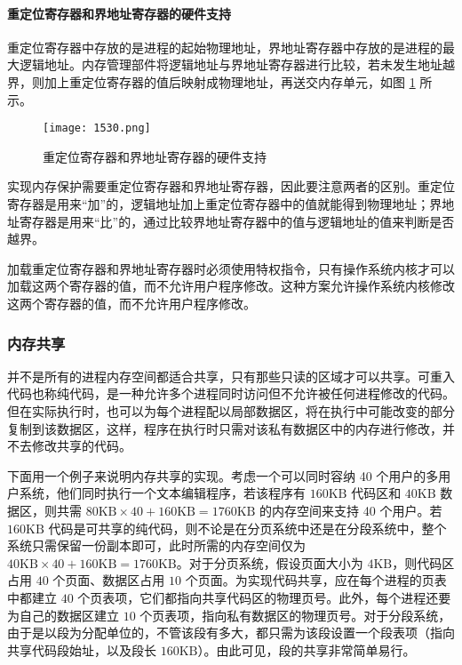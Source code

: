 \documentclass{ctexbook}
\begin{document}
	\paragraph{重定位寄存器和界地址寄存器的硬件支持}
	
	重定位寄存器中存放的是进程的起始物理地址，界地址寄存器中存放的是进程的最大逻辑地址。内存管理部件将逻辑地址与界地址寄存器进行比较，若未发生地址越界，则加上重定位寄存器的值后映射成物理地址，再送交内存单元，如图 \ref{fig:hardware_support} 所示。
	
	\begin{figure}[h]
		\centering
		\texttt{[image: 1530.png]}
		\caption{重定位寄存器和界地址寄存器的硬件支持}
		\label{fig:hardware_support}
	\end{figure}
	
	实现内存保护需要重定位寄存器和界地址寄存器，因此要注意两者的区别。重定位寄存器是用来“加”的，逻辑地址加上重定位寄存器中的值就能得到物理地址；界地址寄存器是用来“比”的，通过比较界地址寄存器中的值与逻辑地址的值来判断是否越界。
	
	加载重定位寄存器和界地址寄存器时必须使用特权指令，只有操作系统内核才可以加载这两个寄存器的值，而不允许用户程序修改。这种方案允许操作系统内核修改这两个寄存器的值，而不允许用户程序修改。
	
	
	\subsubsection{内存共享}
	
	并不是所有的进程内存空间都适合共享，只有那些只读的区域才可以共享。可重入代码也称纯代码，是一种允许多个进程同时访问但不允许被任何进程修改的代码。但在实际执行时，也可以为每个进程配以局部数据区，将在执行中可能改变的部分复制到该数据区，这样，程序在执行时只需对该私有数据区中的内存进行修改，并不去修改共享的代码。
	
	下面用一个例子来说明内存共享的实现。考虑一个可以同时容纳 40 个用户的多用户系统，他们同时执行一个文本编辑程序，若该程序有 $160\text{KB}$ 代码区和 $40\text{KB}$ 数据区，则共需 $80\text{KB} \times 40 + 160\text{KB} = 1760\text{KB}$ 的内存空间来支持 40 个用户。若 $160\text{KB}$ 代码是可共享的纯代码，则不论是在分页系统中还是在分段系统中，整个系统只需保留一份副本即可，此时所需的内存空间仅为 $40\text{KB} \times 40 + 160\text{KB} = 1760\text{KB}$。对于分页系统，假设页面大小为 $4\text{KB}$，则代码区占用 $40$ 个页面、数据区占用 $10$ 个页面。为实现代码共享，应在每个进程的页表中都建立 $40$ 个页表项，它们都指向共享代码区的物理页号。此外，每个进程还要为自己的数据区建立 $10$ 个页表项，指向私有数据区的物理页号。对于分段系统，由于是以段为分配单位的，不管该段有多大，都只需为该段设置一个段表项（指向共享代码段始址，以及段长 $160\text{KB}$）。由此可见，段的共享非常简单易行。
	
\end{document}
